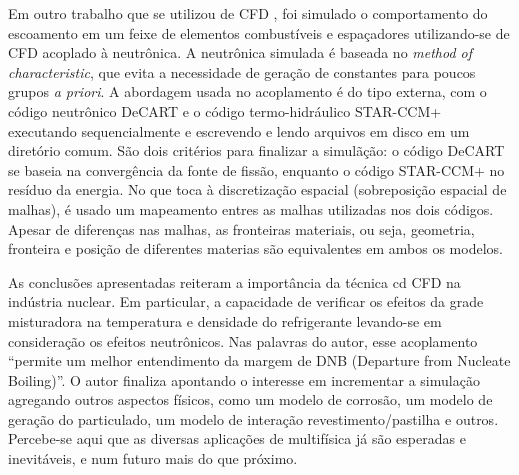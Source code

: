 Em outro trabalho que se utilizou de CFD \cite{Yan2011}, foi simulado o comportamento do escoamento em um feixe de elementos 
combustíveis e espaçadores utilizando-se de CFD acoplado à neutrônica. A neutrônica 
simulada é baseada no \textit{method of characteristic}, que evita a necessidade de geração 
de constantes para poucos grupos \textit{a priori}. A abordagem usada no 
acoplamento é do tipo externa, com o código neutrônico DeCART e o código termo-hidráulico 
STAR-CCM+ executando sequencialmente e escrevendo e lendo arquivos em disco em um 
diretório comum. São dois critérios para finalizar a simulãção: o código DeCART se baseia 
na convergência da fonte de fissão, enquanto o código STAR-CCM+ no resíduo da energia. No que toca à 
discretização espacial (sobreposição espacial de malhas), é usado um mapeamento entres as malhas 
utilizadas nos dois códigos. Apesar de diferenças nas malhas, as fronteiras materiais, ou seja, geometria, 
fronteira e posição de diferentes materias são equivalentes em ambos os modelos.

As conclusões apresentadas reiteram a importância da técnica cd CFD na indústria nuclear. Em particular, 
a capacidade de verificar os efeitos da grade misturadora na temperatura e densidade do refrigerante 
levando-se em consideração os efeitos neutrônicos. Nas palavras do autor, esse acoplamento 
``permite um melhor entendimento da margem de DNB (Departure from Nucleate Boiling)''.
O autor finaliza apontando o interesse em incrementar a simulação 
agregando outros aspectos físicos, como um modelo de corrosão, um modelo de geração do particulado, 
um modelo de interação revestimento/pastilha e outros. Percebe-se aqui que as diversas aplicações 
de multifísica já são esperadas e inevitáveis, e num futuro mais do que próximo.

